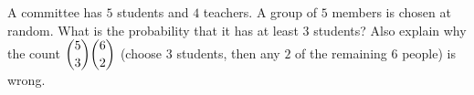 A committee has $5$ students and $4$ teachers. A group of $5$ members is chosen at random. What is the probability that it has at least $3$ students? Also explain why the count $\dbinom53\dbinom62$ (choose $3$ students, then any $2$ of the remaining $6$ people) is wrong.
